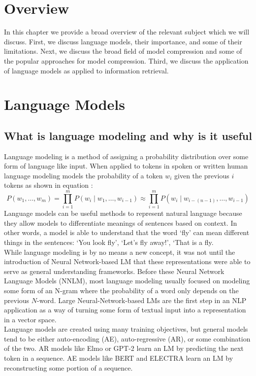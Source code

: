 \section{Overview}
In this chapter we provide a broad overview of the relevant subject which we will discuss. First, we discuss language models, their importance, and some of their limitations. Next, we discuss the broad field of model compression and some of the popular approaches for model compression. Third, we discuss the application of language models as applied to information retrieval. 
\section{Language Models}
\subsection{What is language modeling and why is it useful}
Language modeling is a method of assigning a probability distribution over some form of language like input. When applied to tokens in spoken or written human language modeling models the probability of a token $w_i$ given the previous $i$ tokens as shown in equation :
\begin{equation}
    P(w_{1},\ldots ,w_{m})=\prod _{i=1}^{m}P(w_{i}\mid w_{1},\ldots ,w_{i-1})\approx \prod _{i=1}^{m}P(w_{i}\mid w_{i-(n-1)},\ldots ,w_{i-1})
\label{equation:langmodel}
\end{equation} Language models can be useful methods to represent natural language because they allow models to differentiate meanings of sentences based on context. In other words, a model is able to understand that the word `fly' can mean different things in the sentences: `You look fly', `Let's fly away!', `That is a fly. \\
While language modeling is by no means a new concept, it was not until the introduction of Neural Network-based LM that these representations were able to serve as general understanding frameworks. Before these Neural Network Language Models (NNLM), most language modeling usually focused on modeling some form of an N-gram where the probability of a word only depends on the previous $N$-word. Large Neural-Network-based LMs are the first step in an NLP application as a way of turning some form of textual input into a representation in a vector space. \\
Language models are created using many training objectives, but general models tend to be either auto-encoding (AE), auto-regressive (AR), or some combination of the two. AR models like Elmo \cite{Peters2018DeepCW} or GPT-2 \cite{Radford2019LanguageMA} learn an LM by predicting the next token in a sequence. AE models like BERT \cite{Devlin2019BERTPO} and ELECTRA \cite{Clark2020ELECTRAPT} learn an LM by reconstructing some portion of a sequence.
